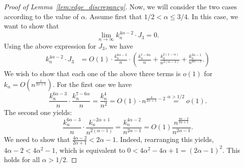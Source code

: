 \begin{proof}[Proof of Lemma~\ref{lem:edge_discrepancy}]

Now, we will consider the two cases according to the value of $\alpha$. 
Assume first that $1/2 < \alpha \leq 3/4$. 
In this case, we want to show that 
\begin{equation} \label{eq:int3_to_prove_I}
\lim_{n \to \infty} k_n^{4\alpha -2} \cdot J_3 = 0. 
\end{equation}
Using the above expression for $J_3$, we have 
\begin{align*} 
 k_n^{4\alpha -2} \cdot J_3 &= O(1) \cdot  
 \frac{k_n^{6\alpha -3}}{n} \cdot 
\left( 
\frac{k_n^{7-6\alpha}}{n} + \frac{k_n^{2(1-\alpha)}}{n^{2(\alpha-1)}} 
+\frac{k_n^{2\alpha-1}}{n^{4\alpha - 3}}.
\right) 
\end{align*}
We wish to show that each one of the above three terms is $o(1)$ for $k_n = O(n^{\frac{1}{2\alpha +1}})$. 
For the first one we have 
$$ \frac{k_n^{6\alpha -3}}{n} \cdot \frac{k_n^{7-6\alpha}}{n} = \frac{k_n^{4}}{n^2} = O(1) \cdot n^{\frac{4}{2\alpha +1} -2} \stackrel{\alpha >1/2}{=} o(1). 
$$
The second one yields: 
$$ \frac{k_n^{6\alpha -3}}{n} \cdot  \frac{k_n^{-2\alpha+1}}{n^{2(\alpha-1)}} =\frac{k_n^{4\alpha -2}}{n^{2\alpha -1}} =O(1) \frac{n^{\frac{4\alpha -2}{2\alpha+1}}}{n^{2\alpha -1}}.$$
We need to show that $\frac{4\alpha -2}{2\alpha+1}< 2\alpha -1$. Indeed, rearranging this 
 yields, $4\alpha -2 < 4\alpha^2 -1$, which is equivalent to $0< 4\alpha^2 - 4\alpha +1=(2\alpha- 1)^2$. This holds for all $\alpha >1/2$.  
 

\end{proof}
